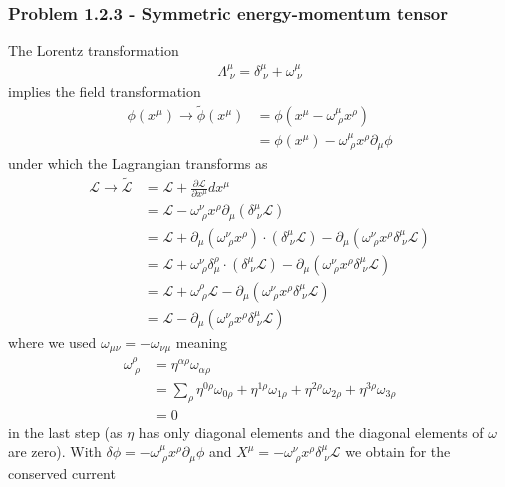 \documentclass[10pt,a4paper]{book}
\theoremstyle{definition}
\begin{document}
\subsubsection{Problem 1.2.3 - Symmetric energy-momentum tensor}
The Lorentz transformation
\begin{align}
    \Lambda^\mu_{\;\nu}=\delta^\mu_{\;\nu}+\omega^\mu_{\;\nu}
\end{align}
implies the field transformation
\begin{align}
    \phi(x^\mu)\rightarrow\tilde\phi(x^\mu)&=\phi(x^\mu-\omega^\mu_{\;\rho}x^\rho)\\
    &=\phi(x^\mu)-\omega^\mu_{\;\rho}x^\rho\partial_\mu\phi
\end{align}
under which the Lagrangian transforms as
\begin{align}
    \mathcal{L}\rightarrow\tilde{\mathcal{L}}&=\mathcal{L}+\frac{\partial\mathcal{L}}{\partial x^\mu}dx^\mu\\
    &=\mathcal{L}-\omega^\nu_{\;\rho}x^\rho\partial_\mu(\delta^\mu_{\;\nu}\mathcal{L})\\
    &=\mathcal{L}+\partial_\mu(\omega^\nu_{\;\rho}x^\rho)\cdot(\delta^\mu_{\;\nu}\mathcal{L})-\partial_\mu(\omega^\nu_{\;\rho}x^\rho\delta^\mu_{\;\nu}\mathcal{L})\\
    &=\mathcal{L}+\omega^\nu_{\;\rho}\delta^\rho_\mu\cdot(\delta^\mu_{\;\nu}\mathcal{L})-\partial_\mu(\omega^\nu_{\;\rho}x^\rho\delta^\mu_{\;\nu}\mathcal{L})\\
    &=\mathcal{L}+\omega^\rho_{\;\rho}\mathcal{L}-\partial_\mu(\omega^\nu_{\;\rho}x^\rho\delta^\mu_{\;\nu}\mathcal{L})\\
    &=\mathcal{L}-\partial_\mu(\omega^\nu_{\;\rho}x^\rho\delta^\mu_{\;\nu}\mathcal{L})
\end{align}
where we used $\omega_{\mu\nu}=-\omega_{\nu\mu}$ meaning
\begin{align}
    \omega^\rho_{\;\rho}&=\eta^{\alpha\rho}\omega_{\alpha\rho}\\
    &=\sum_\rho\eta^{0\rho}\omega_{0\rho}+\eta^{1\rho}\omega_{1\rho}+\eta^{2\rho}\omega_{2\rho}+\eta^{3\rho}\omega_{3\rho}\\
    &=0
\end{align}    
in the last step (as $\eta$ has only diagonal elements and the diagonal elements of $\omega$ are zero). With $\delta\phi=-\omega^\mu_{\;\rho}x^\rho\partial_\mu\phi$ and $X^\mu=-\omega^\nu_{\;\rho}x^\rho\delta^\mu_{\;\nu}\mathcal{L}$ we obtain for the conserved current  
\end{document}
